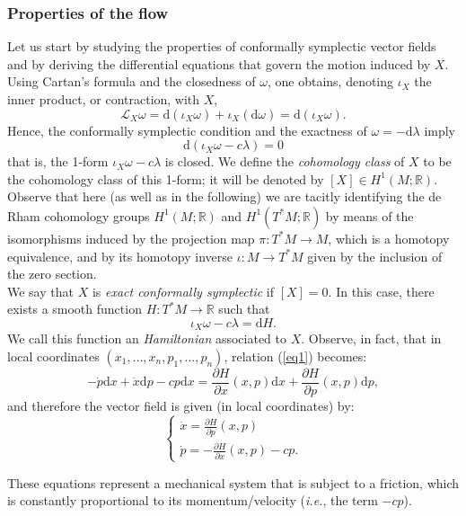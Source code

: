 \documentclass[11pt]{article}
\theoremstyle{definition}
\def\d{\mathrm{d}}
\begin{document}
\subsubsection{Properties of the flow}
Let us start by studying the properties of conformally symplectic vector fields and by deriving the differential equations that govern the motion induced by $X$. Using Cartan's formula and the closedness of $\omega$, one obtains, denoting $\iota_X$ the inner product, or contraction, with $X$,
$$
{\mathcal L}_X \omega = \d(\iota_X \omega) + \iota_X(\d\omega) = \d(\iota_X \omega).
$$
Hence, the conformally symplectic condition and the exactness of $\omega=-\d\lambda$ imply
$$\d(\iota_X\omega - c \lambda) =0$$
that is, the 1-form $\iota_X\omega - c \lambda$ is closed. We define the {\it cohomology class} of $X$ to be the cohomology class of this 1-form; it will be denoted by $[X] \in H^1(M;{\mathbb R})$. Observe that here (as well as in the following) we are tacitly identifying the de Rham cohomology groups $H^1(M;{\mathbb R})$ and $H^1(T^*M;{\mathbb R})$ by means of the isomorphisms induced by the projection map $\pi:T^*M\longrightarrow M$, which is a homotopy equivalence, and by its homotopy inverse $\iota: M\longrightarrow T^*M$ given by the inclusion of the zero section.\\


\noindent We say that $X$ is {\it exact conformally symplectic} if $[X]=0$. In this case, there exists a smooth function $H: T^*M \longrightarrow {\mathbb R}$ such that
\begin{equation}\label{eq1}
\iota_X\omega - c \lambda = \d H.
\end{equation}
We call this function an {\it Hamiltonian} associated to $X$. Observe, in fact, that in local coordinates $(x_1,\ldots, x_n,p_1,\ldots, p_n)$, relation (\ref{eq1}) becomes:
$$
-\dot{p} \d x + \dot{x} \d p - c p \d x = \frac{\partial H}{\partial x}(x,p) \d x + \frac{\partial H}{\partial p}(x,p) \d p,
$$
and therefore the vector field is given (in local coordinates) by:
\begin{equation}\label{eqmotion}
\left\{
\begin{array}{l}
\dot{x} = \frac{\partial H}{\partial p}(x,p)\\
\dot{p} = - \frac{\partial H}{\partial x}(x,p) - c p.
\end{array}
\right.
\end{equation}

These equations represent a mechanical system that is subject to a friction, which is constantly proportional to its momentum/velocity ({\it i.e.}, the term $-c p$).\\
\end{document}
